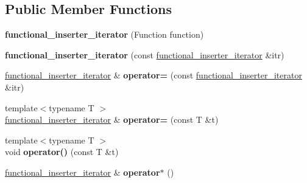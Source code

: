 \subsection*{Public Member Functions}
\begin{DoxyCompactItemize}
\item 
\hypertarget{classstrtk_1_1functional__inserter__iterator_a5911baf691923d5b06e8892c96a0ced3}{{\bfseries functional\-\_\-inserter\-\_\-iterator} (Function function)}\label{classstrtk_1_1functional__inserter__iterator_a5911baf691923d5b06e8892c96a0ced3}

\item 
\hypertarget{classstrtk_1_1functional__inserter__iterator_a96341e6c900bd3305da78fe31a7108f9}{{\bfseries functional\-\_\-inserter\-\_\-iterator} (const \hyperlink{classstrtk_1_1functional__inserter__iterator}{functional\-\_\-inserter\-\_\-iterator} \&itr)}\label{classstrtk_1_1functional__inserter__iterator_a96341e6c900bd3305da78fe31a7108f9}

\item 
\hypertarget{classstrtk_1_1functional__inserter__iterator_aedb655893075089c08c82a82a938a046}{\hyperlink{classstrtk_1_1functional__inserter__iterator}{functional\-\_\-inserter\-\_\-iterator} \& {\bfseries operator=} (const \hyperlink{classstrtk_1_1functional__inserter__iterator}{functional\-\_\-inserter\-\_\-iterator} \&itr)}\label{classstrtk_1_1functional__inserter__iterator_aedb655893075089c08c82a82a938a046}

\item 
\hypertarget{classstrtk_1_1functional__inserter__iterator_a20430ca728937df9e4f47fd8516685e9}{{\footnotesize template$<$typename T $>$ }\\\hyperlink{classstrtk_1_1functional__inserter__iterator}{functional\-\_\-inserter\-\_\-iterator} \& {\bfseries operator=} (const T \&t)}\label{classstrtk_1_1functional__inserter__iterator_a20430ca728937df9e4f47fd8516685e9}

\item 
\hypertarget{classstrtk_1_1functional__inserter__iterator_a73881ddd665ed765eb9df9ab228f4de0}{{\footnotesize template$<$typename T $>$ }\\void {\bfseries operator()} (const T \&t)}\label{classstrtk_1_1functional__inserter__iterator_a73881ddd665ed765eb9df9ab228f4de0}

\item 
\hypertarget{classstrtk_1_1functional__inserter__iterator_acb8c6f3aaf05c232cbb9b0224d13cdd9}{\hyperlink{classstrtk_1_1functional__inserter__iterator}{functional\-\_\-inserter\-\_\-iterator} \& {\bfseries operator$\ast$} ()}\label{classstrtk_1_1functional__inserter__iterator_acb8c6f3aaf05c232cbb9b0224d13cdd9}


\end{DoxyCompactItemize}
